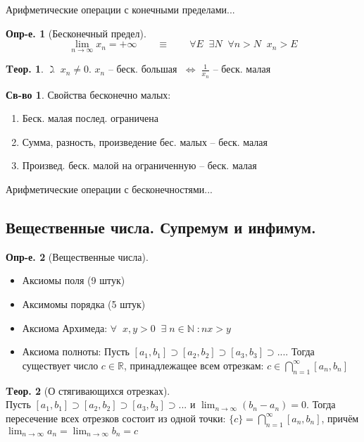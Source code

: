 \documentclass[a4paper,12pt]{article}
\numberwithin{figure}{section}
\theoremstyle{definition}
\newtheorem{definition}{Опр-е.}[section]
\newtheorem*{property}{Св-во}  %
\theoremstyle{definition}
\newtheorem{theorem}{Tеор.}[section]
\def\.{\;\;}
\def\DS{\displaystyle}
\def\ntoinf{n \to \infty}
\def\mathN{\mathbb{N}}
\def\mathR{\mathbb{R}}
\def\lets {$\gimel\;$}
\def\iff {$\;\Longleftrightarrow\;$}
\begin{document}
Арифметические операции с конечными пределами...

\begin{definition}[Бесконечный предел] \[
	\lim_{\ntoinf} x_n = +\infty
	\qquad\equiv\qquad
	\forall E \. \exists N \. \forall n>N \. x_n>E
	\]
\end{definition}

\begin{theorem}
	\lets $x_n \neq 0$. $x_n$ -- беск. большая \iff $\frac1{x_n}$ -- беск. малая
\end{theorem}

\begin{property}
	Свойства бесконечно малых:
	\begin{enumerate}
		\item Беск. малая послед. ограничена
		\item Сумма, разность, произведение бес. малых -- беск. малая
		\item Произвед. беск. малой на ограниченную -- беск. малая
	\end{enumerate}
\end{property}

Арифметические операции с бесконечностями...


\subsection{Вещественные числа. Супремум и инфимум.}

\begin{definition}[Вещественные числа] \ \\
	\begin{itemize}
		\item Аксиомы поля (9 штук)
		\item Аксимомы порядка (5 штук)
		\item Аксиома Архимеда:
				$ \forall\. x,y>0 \. \exists \; n \in \mathN \;: nx>y $
		\item Аксиома полноты:
			Пусть $[a_1,b_1] \supset [a_2,b_2] \supset [a_3,b_3] \supset...$.
			Тогда существует число $c \in \mathR$, принадлежащее всем отрезкам:
			$\DS c \in \bigcap_{n=1}^{\infty} [a_n,b_n]$
	\end{itemize}
\end{definition}

\begin{theorem}[О стягивающихся отрезках] \ \\
	Пусть $[a_1,b_1] \supset [a_2,b_2] \supset [a_3,b_3] \supset ...$
	и $\DS \lim_{\ntoinf}(b_n-a_n) = 0$.
	Тогда пересечение всех отрезков состоит из одной точки:
	$\DS \{c\} = \bigcap_{n=1}^{\infty} [a_n,b_n]$, причём
	$\DS \lim_{\ntoinf}a_n = \lim_{\ntoinf}b_n = c$
\end{theorem}
\end{document}
